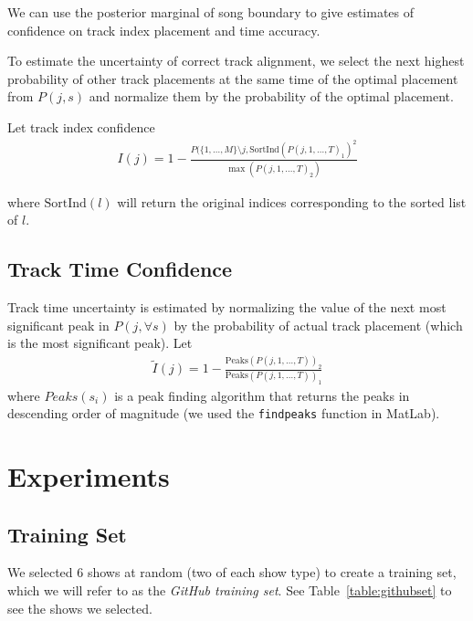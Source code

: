 \documentclass[twocolumn]{article}
\begin{document}
We can use the posterior marginal of song boundary to give estimates of confidence on track index placement and time accuracy.

To estimate the uncertainty of correct track alignment, we select the next highest probability of other track placements at the same time of the optimal placement from $P(j,s)$ and normalize them by the probability of the optimal placement.

Let track index confidence
\begin{align*}
I( j ) = 1-\frac{ P( \{1,\ldots,M\} \setminus j, \mathrm{SortInd}( P(j, 1,\ldots,T)_1)^2 }{ \max( P(j, 1,\ldots,T)_2) }
\end{align*}

where $\mathrm{SortInd}(l)$ will return the original indices corresponding to the sorted list of $l$. 

\subsection{Track Time Confidence}

Track time uncertainty is estimated by normalizing the value of the next most significant peak in $P(j,\forall s)$ by the probability of actual track placement (which is the most significant peak). 
Let 
\begin{align*}
\tilde I( j ) = 1-\frac{ \mathrm{Peaks}( P(j, 1,\ldots,T ) )_2 } { \mathrm{Peaks}( P(j, 1,\ldots,T ))_1 }
\end{align*} where $Peaks(s_i)$ is a peak finding algorithm that returns the peaks in descending order of magnitude (we used the \texttt{findpeaks} function in MatLab).


\section{Experiments}

\subsection{Training Set}

We selected $6$ shows at random (two of each show type)  to create a training set, which we will refer to as the \textit{GitHub training set}. See Table~\ref{table:githubset} to see the shows we selected.
\end{document}
